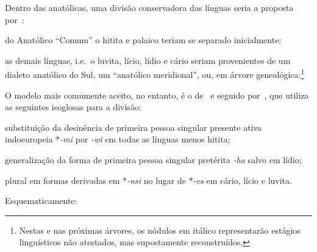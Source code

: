 Dentro das anatólicas, uma divisão conservadora das línguas seria a proposta
por~\citet[305--6]{Rieken2017}:
\begin{inparaenum}
	\item do Anatólico ``Comum'' o hitita e palaico teriam se separado
	inicialmente;
	\item as demais línguas, i.e.\ o luvita, lício, lídio e cário seriam
	provenientes de um dialeto anatólico do Sul, um
	``anatólico meridional'', ou, em árvore genealógica:\footnote{Nestas e nas
		próximas árvores, os nódulos em itálico representarão estágios linguísticos
		não atestados, mas supostamente reconstruídos.}
\end{inparaenum}

\vspace{3pt}
\begin{center}
\end{center}

O modelo mais comumente aceito, no entanto, é o de~\citet[92]{Oettinger1978} e
seguido por~\citet[6]{Yakubovich2010}, que utiliza as seguintes isoglosas para a
divisão:
\begin{inparaenum}
	\item substituição da desinência de primeira pessoa singular presente ativa
	indoeuropeia *\emph{-mi} por \emph{-wi} em todas as línguas menos hitita;
	\item generalização da forma de primeira pessoa singular pretérita \emph{-ha}
	salvo em lídio;
	\item plural em formas derivadas em *\emph{-nsi} no lugar de *\emph{-es} em
	cário, lício e luvita.
\end{inparaenum}
Esquematicamente:

\begin{center}
\end{center}

